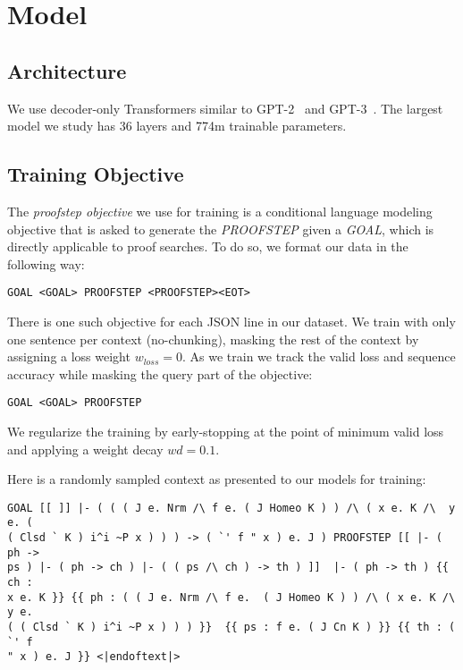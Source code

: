 \documentclass{article}
\begin{document}
\section{Model}

\subsection{Architecture}

We use decoder-only Transformers similar to GPT-2~\cite{radford2019language} and GPT-3~\cite{brown2020language}. The largest model we study has 36 layers and 774m trainable parameters.

\subsection{Training Objective}

The \textit{proofstep objective} we use for training is a conditional language modeling objective that is asked to generate the \textit{PROOFSTEP} given a \textit{GOAL}, which is directly applicable to proof searches. To do so, we format our data in the following way:

\begin{verbatim}
GOAL <GOAL> PROOFSTEP <PROOFSTEP><EOT>
\end{verbatim}

There is one such objective for each JSON line in our dataset. We train with only one sentence per context (no-chunking), masking the rest of the context by assigning a loss weight $w_{\mathit{loss}}=0$. As we train we track the valid loss and sequence accuracy while masking the query part of the objective:

\begin{verbatim}
GOAL <GOAL> PROOFSTEP
\end{verbatim}

We regularize the training by early-stopping at the point of minimum valid loss and applying a weight decay $\mathit{wd}=0.1$.

Here is a randomly sampled context as presented to our models for training:

\begin{verbatim}
GOAL [[ ]] |- ( ( ( J e. Nrm /\ f e. ( J Homeo K ) ) /\ ( x e. K /\  y e. ( 
( Clsd ` K ) i^i ~P x ) ) ) -> ( `' f " x ) e. J ) PROOFSTEP [[ |- ( ph -> 
ps ) |- ( ph -> ch ) |- ( ( ps /\ ch ) -> th ) ]]  |- ( ph -> th ) {{ ch : 
x e. K }} {{ ph : ( ( J e. Nrm /\ f e.  ( J Homeo K ) ) /\ ( x e. K /\ y e. 
( ( Clsd ` K ) i^i ~P x ) ) ) }}  {{ ps : f e. ( J Cn K ) }} {{ th : ( `' f 
" x ) e. J }} <|endoftext|>
\end{verbatim}
\end{document}
